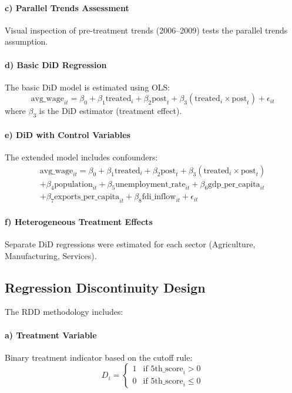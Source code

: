 \documentclass[a4paper,12pt,headsepline]{scrartcl} %
\begin{document}
\paragraph{c) Parallel Trends Assessment}
Visual inspection of pre-treatment trends (2006--2009) tests the parallel trends assumption.

\paragraph{d) Basic DiD Regression}
The basic DiD model is estimated using OLS:
\begin{equation}
\text{avg\_wage}_{it} = \beta_0 + \beta_1 \text{treated}_i + \beta_2 \text{post}_t + \beta_3 (\text{treated}_i \times \text{post}_t) + \epsilon_{it}
\end{equation}
where $\beta_3$ is the DiD estimator (treatment effect).

\paragraph{e) DiD with Control Variables}
The extended model includes confounders:
\begin{multline}
\text{avg\_wage}_{it} = \beta_0 + \beta_1 \text{treated}_i + \beta_2 \text{post}_t + \beta_3 (\text{treated}_i \times \text{post}_t) \\
+ \beta_4 \text{population}_{it} + \beta_5 \text{unemployment\_rate}_{it} + \beta_6 \text{gdp\_per\_capita}_{it} \\
+ \beta_7 \text{exports\_per\_capita}_{it} + \beta_8 \text{fdi\_inflow}_{it} + \epsilon_{it}
\end{multline}

\paragraph{f) Heterogeneous Treatment Effects}
Separate DiD regressions were estimated for each sector (Agriculture, Manufacturing, Services).

\subsection{Regression Discontinuity Design}

The RDD methodology includes:

\paragraph{a) Treatment Variable}
Binary treatment indicator based on the cutoff rule:
\begin{equation}
D_i = 
\begin{cases}
1 & \text{if } \text{5th\_score}_i > 0 \\
0 & \text{if } \text{5th\_score}_i \leq 0
\end{cases}
\end{equation}
\end{document}
